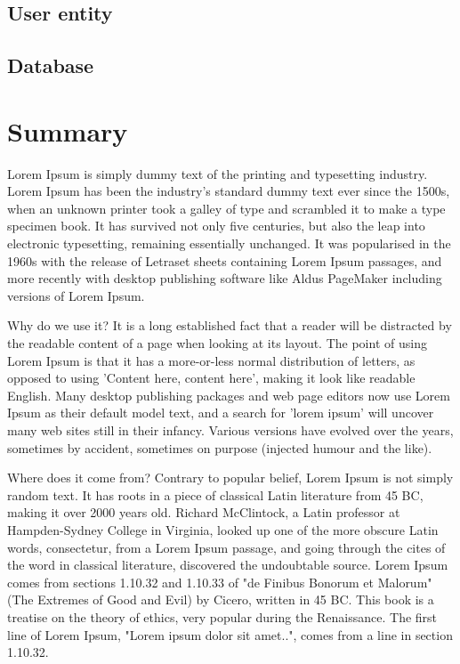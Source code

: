 \documentclass[a4paper,12pt]{book}
\begin{document}
\section{User entity}
\section{Database}
\chapter{Summary}
{
Lorem Ipsum is simply dummy text of the printing and typesetting industry. Lorem Ipsum has been the industry's standard dummy text ever since the 1500s, when an unknown printer took a galley of type and scrambled it to make a type specimen book. It has survived not only five centuries, but also the leap into electronic typesetting, remaining essentially unchanged. It was popularised in the 1960s with the release of Letraset sheets containing Lorem Ipsum passages, and more recently with desktop publishing software like Aldus PageMaker including versions of Lorem Ipsum.

Why do we use it?
It is a long established fact that a reader will be distracted by the readable content of a page when looking at its layout. The point of using Lorem Ipsum is that it has a more-or-less normal distribution of letters, as opposed to using 'Content here, content here', making it look like readable English. Many desktop publishing packages and web page editors now use Lorem Ipsum as their default model text, and a search for 'lorem ipsum' will uncover many web sites still in their infancy. Various versions have evolved over the years, sometimes by accident, sometimes on purpose (injected humour and the like).


Where does it come from?
Contrary to popular belief, Lorem Ipsum is not simply random text. It has roots in a piece of classical Latin literature from 45 BC, making it over 2000 years old. Richard McClintock, a Latin professor at Hampden-Sydney College in Virginia, looked up one of the more obscure Latin words, consectetur, from a Lorem Ipsum passage, and going through the cites of the word in classical literature, discovered the undoubtable source. Lorem Ipsum comes from sections 1.10.32 and 1.10.33 of "de Finibus Bonorum et Malorum" (The Extremes of Good and Evil) by Cicero, written in 45 BC. This book is a treatise on the theory of ethics, very popular during the Renaissance. The first line of Lorem Ipsum, "Lorem ipsum dolor sit amet..", comes from a line in section 1.10.32.

}
\end{document}
